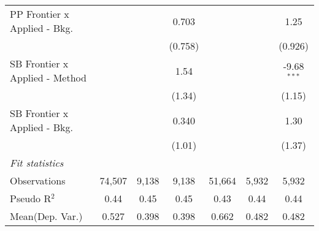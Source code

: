 \begin{tabular}{lcccccc}
   PP Frontier x Applied - Bkg.   &               &              & 0.703         &               &             & 1.25\\   
                                  &               &              & (0.758)       &               &             & (0.926)\\   
   SB Frontier x Applied - Method &               &              & 1.54          &               &             & -9.68$^{***}$\\   
                                  &               &              & (1.34)        &               &             & (1.15)\\   
   SB Frontier x Applied - Bkg.   &               &              & 0.340         &               &             & 1.30\\   
                                  &               &              & (1.01)        &               &             & (1.37)\\   
   \midrule
   \emph{Fit statistics}\\
   Observations                   & 74,507        & 9,138        & 9,138         & 51,664        & 5,932       & 5,932\\  
   Pseudo R$^2$                   & 0.44          & 0.45         & 0.45          & 0.43          & 0.44        & 0.44\\  
Mean(Dep. Var.) & 0.527 & 0.398 & 0.398 & 0.662 & 0.482 & 0.482 \\
   

\end{tabular}
